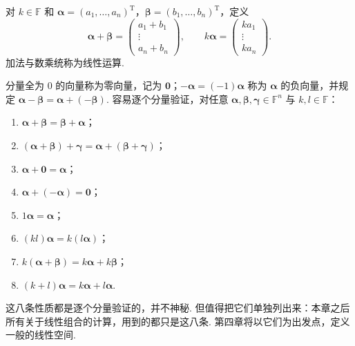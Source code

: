 \documentclass[lang=cn,10.5pt,scheme=chinese,toc=twocol,section,chinesefont=nofont,
twoside,citestyle=gb7714-2015,bibstyle=gb7714-2015]{elegantbook}
\DeclareRobustCommand{\textbf}[1]{{\lnsemiboldlatin\lnsemiboldcjk #1}}
\newcommand{\vv}[1]{\boldsymbol{#1}}
\newcommand{\zero}{\boldsymbol{0}}          %
\newcommand{\trans}{\mathrm{T}}             %
\numberwithin{equation}{section}   %
\begin{document}
对 $k\in\mathbb{F}$ 和 $\vv{\alpha}=(a_1,\ldots,a_n)^\trans$，$\vv{\beta}=(b_1,\ldots,b_n)^\trans$，定义
\[
  \vv{\alpha} + \vv{\beta} =
  \begin{pmatrix}
    a_1+ b_1 \\ \vdots \\ a_n+ b_n
  \end{pmatrix}
  ,\qquad
  k \vv{\alpha} =
  \begin{pmatrix}
    ka_1 \\ \vdots \\ ka_n
  \end{pmatrix}
  .
\]
加法与数乘统称为\textbf{线性运算}.

分量全为 $0$ 的向量称为\textbf{零向量}，记为 $\zero$；$-\vv\alpha=(-1)\vv\alpha$ 称为 $\vv\alpha$ 的\textbf{负向量}，并规定 $\vv\alpha-\vv\beta=\vv\alpha+(-\vv\beta)$. 容易逐个分量验证，对任意 $\vv\alpha,\vv\beta,\vv\gamma\in\mathbb{F}^n$ 与 $k,l\in\mathbb{F}$：
\begin{enumerate}
  \item $\vv{\alpha}+\vv{\beta} =\vv{\beta}+\vv{\alpha}$；
  \item $(\vv{\alpha}+\vv{\beta})+\vv{\gamma} = \vv{\alpha}+(\vv{\beta}+\vv{\gamma})$；
  \item $\vv{\alpha}+\zero=\vv{\alpha}$；
  \item $\vv{\alpha}+(-\vv{\alpha})=\zero$；
  \item $1\vv{\alpha}=\vv{\alpha}$；
  \item $(kl)\vv{\alpha}=k(l\vv{\alpha})$；
  \item $k(\vv{\alpha}+\vv{\beta})=k\vv{\alpha}+k\vv{\beta}$；
  \item $(k+l)\vv{\alpha}=k\vv{\alpha}+l\vv{\alpha}$.
\end{enumerate}
这八条性质都是逐个分量验证的，并不神秘. 但值得把它们单独列出来：本章之后所有关于线性组合的计算，用到的都只是这八条. 第四章将以它们为出发点，定义一般的线性空间.
\end{document}
